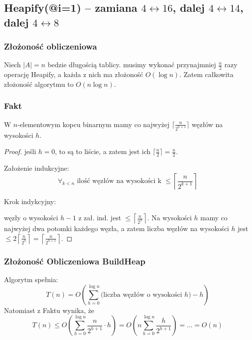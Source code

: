 \documentclass[11pt,a4paper]{article}
\begin{document}
\subsection*{Heapify(@i=1) – zamiana $4 \leftrightarrow 16$, dalej $4 \leftrightarrow 14$, dalej $4 \leftrightarrow 8$}
\begin{center}\end{center}

\subsubsection*{Złożoność obliczeniowa}
Niech $|A|=n$ bedzie długością tablicy. musimy wykonać przynajmniej $\frac{n}{2}$ razy operację Heapify, a każda z nich ma złożoność $O(\log n)$. Zatem całkowita złożoność algorytmu to $O(n\log n)$.
\subsubsection*{Fakt}
W $n$-elementowym kopcu binarnym mamy co najwyżej $\lceil\frac{n}{2^{h+1}}\rceil$ węzłów na wysokości $h$.
\begin{proof}
    jeśli $h=0$, to są to liście, a zatem jest ich $\lceil\frac{n}{2}\rceil= \frac{n}{2}$.

    Założenie indukcyjne:
    \[
        \forall_{k<n} \text{ ilość węzłów na wysokości k } \leq \left\lceil\frac{n}{2^{k+1}}\right\rceil
    \]

    Krok indykcyjny:

    węzły o wysokości $h-1$ z zał. ind. jest $\leq \left\lceil\frac{n}{2^{h}}\right\rceil$. Na wysokości $h$ mamy co najwyżej dwa potomki każdego węzła, a zatem liczba węzłów na wysokości $h$ jest $\leq 2\left\lceil\frac{n}{2^{h}}\right\rceil = \left\lceil\frac{n}{2^{h+1}}\right\rceil$.
\end{proof}
\subsubsection{Złożoność Obliczeniowa BuildHeap}
Algorytm spełnia:
\[
    T(n)= O\left(\sum_{h=0}^{\log n} \text{(liczba węzłów o wysokości $h$)} -h\right)
\]
Natomiast z Faktu wynika, że
\[
    T(n) \leq O\left(\sum_{h=0}^{\log n} \frac{n}{2^{h+1}}\cdot h\right) =O\left(n\sum_{h=0}^{\log n} \frac{h}{2^{h+1}}\right)=\dots=O(n)
\]
\end{document}
